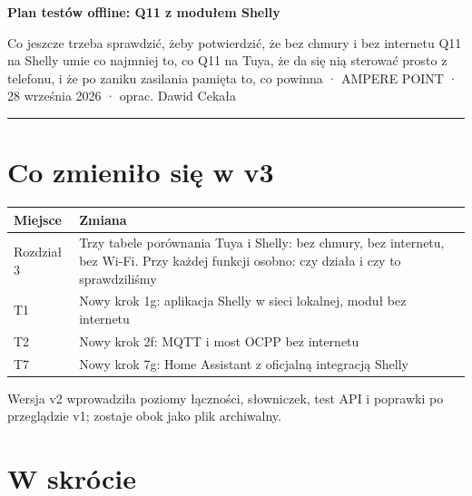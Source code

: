 \documentclass[11pt,a4paper]{article}
\begin{document}
{\LARGE\bfseries Plan testów offline: Q11 z modułem Shelly\par}
{\large Co jeszcze trzeba sprawdzić, żeby potwierdzić, że bez chmury i bez internetu Q11 na Shelly umie co najmniej to, co Q11 na Tuya, że da się nią sterować prosto z telefonu, i że po zaniku zasilania pamięta to, co powinna · AMPERE POINT · 28 września 2026 · oprac. Dawid Cekała\par}
\vspace{4pt}\textcolor{apteal}{\rule{\textwidth}{1.2pt}}

\section*{Co zmieniło się w v3}

\begin{longtable}{>{\raggedright\arraybackslash}p{1.65cm}>{\raggedright\arraybackslash}p{14.07cm}}
\toprule
\rowcolor{apteallight}\textbf{Miejsce} & \textbf{Zmiana} \\
\midrule\endhead
\bottomrule\endfoot
Rozdział 3 & Trzy tabele porównania Tuya i Shelly: bez chmury, bez internetu, bez Wi-Fi. Przy każdej funkcji osobno: czy działa i czy to sprawdziliśmy \\
T1 & Nowy krok 1g: aplikacja Shelly w sieci lokalnej, moduł bez internetu \\
T2 & Nowy krok 2f: MQTT i most OCPP bez internetu \\
T7 & Nowy krok 7g: Home Assistant z oficjalną integracją Shelly \\
\end{longtable}

Wersja v2 wprowadziła poziomy łączności, słowniczek, test API i poprawki po przeglądzie v1; zostaje obok jako plik archiwalny.


\section*{W skrócie}
\end{document}

